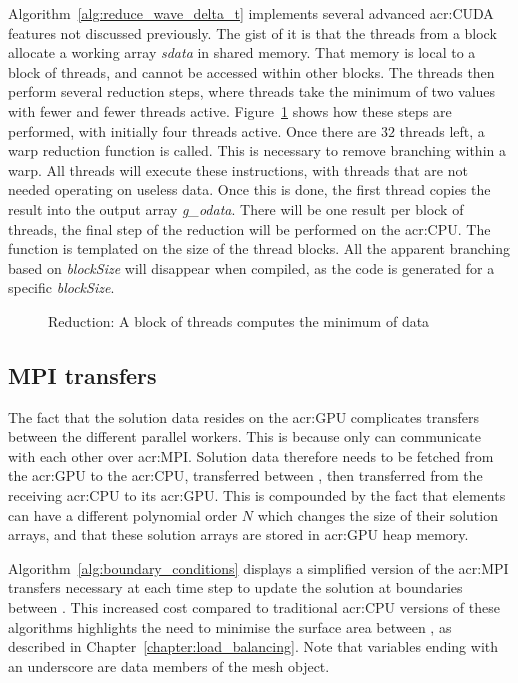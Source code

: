 Algorithm~\ref{alg:reduce_wave_delta_t} implements several advanced \acrshort{acr:CUDA} features not
discussed previously. The gist of it is that the threads from a block allocate a working array
\textit{sdata} in shared memory. That memory is local to a block of threads, and cannot be accessed
within other blocks. The threads then perform several reduction steps, where threads take the
minimum of two values with fewer and fewer threads active. Figure~\ref{fig:reduction} shows how
these steps are performed, with initially four threads active. Once there are \(32\) threads left, a
warp reduction function is called. This is necessary to remove branching within a warp. All threads
will execute these instructions, with threads that are not needed operating on useless data. Once
this is done, the first thread copies the result into the output array \textit{g\_odata}. There will
be one result per block of threads, the final step of the reduction will be performed on the
\acrshort{acr:CPU}. The function is templated on the size of the thread blocks. All the apparent
branching based on \textit{blockSize} will disappear when compiled, as the code is generated for a
specific \textit{blockSize}.

\begin{figure}[H]
	\centering
	
	\caption{Reduction: A block of threads computes the minimum of data}\label{fig:reduction}
\end{figure}

\subsection{MPI transfers}\label{subsection:graphics_processing_units:implementation:mpi_transfers}

The fact that the solution data resides on the \acrshort{acr:GPU} complicates transfers between the
different parallel workers. This is because only  can communicate with each
other over \acrshort{acr:MPI}. Solution data therefore needs to be fetched from the
\acrshort{acr:GPU} to the \acrshort{acr:CPU}, transferred between , then
transferred from the receiving \acrshort{acr:CPU} to its \acrshort{acr:GPU}. This is compounded by
the fact that elements can have a different polynomial order \(N\) which changes the size of their
solution arrays, and that these solution arrays are stored in \acrshort{acr:GPU} heap memory.

Algorithm~\ref{alg:boundary_conditions} displays a simplified version of the \acrshort{acr:MPI}
transfers necessary at each time step to update the solution at boundaries between
. This increased cost compared to traditional \acrshort{acr:CPU} versions of
these algorithms highlights the need to minimise the surface area between , as
described in Chapter~\ref{chapter:load_balancing}. Note that variables ending with an underscore are
data members of the mesh object.

